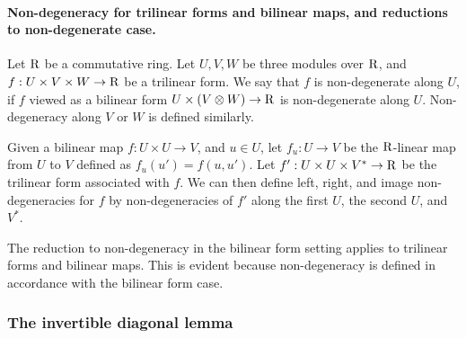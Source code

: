 \paragraph{Non-degeneracy for trilinear forms and bilinear maps, and reductions to non-degenerate case.} Let $\mathrm{R}$ be a commutative ring. Let $U, V, W$ be three modules over $\mathrm{R}$, and $f:U\times V\times W\to\mathrm{R}$ be a trilinear form. We say that $f$ is non-degenerate along $U$, if $f$ viewed as a bilinear form $U\times (V\otimes W)\to \mathrm{R}$ is non-degenerate along $U$. Non-degeneracy along $V$ or $W$ is defined similarly.

Given a bilinear map $f:U\times U\to V$, and $u\in U$, let $f_u:U\to V$ be the $\mathrm{R}$-linear map from $U$ to $V$ defined as $f_u(u')=f(u, u')$. Let $f':U\times U\times V^*\to \mathrm{R}$ be the trilinear form associated with $f$. We can then define left, right, and image non-degeneracies for $f$ by non-degeneracies of $f'$ along the first $U$, the second $U$, and $V^*$. 



The reduction to non-degeneracy in the bilinear form setting applies to trilinear forms and bilinear maps. This is evident because non-degeneracy is defined in accordance with the bilinear form case. 

\subsubsection{The invertible diagonal lemma}\label{subsec:invertible}

